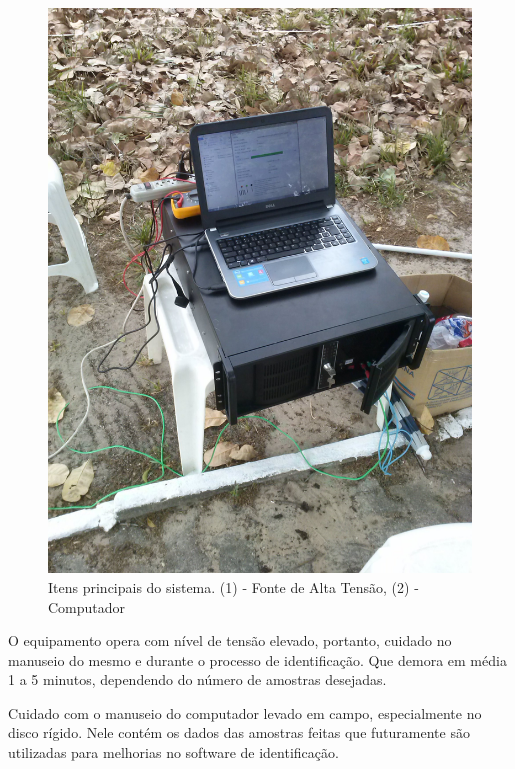 \documentclass[a4paper, 10pt]{article}
\begin{document}
\begin{figure}[!h]
        \caption{\label{fig_fonte}Itens principais do sistema. (1) - Fonte de Alta Tensão, (2) - Computador}
	    \begin{center}
	        \includegraphics[scale=0.1]{../fotos/CAM00189.jpg}
	    \end{center}
\end{figure}

O equipamento opera com nível de tensão elevado, portanto, cuidado no 
manuseio do mesmo e durante o processo de identificação. Que demora em
média
1 a 5 minutos, dependendo do número de amostras desejadas.

Cuidado com o manuseio do computador levado em campo, especialmente 
no disco rígido. Nele contém os dados das amostras feitas que futuramente
são utilizadas para melhorias no software de identificação. 
\end{document}
